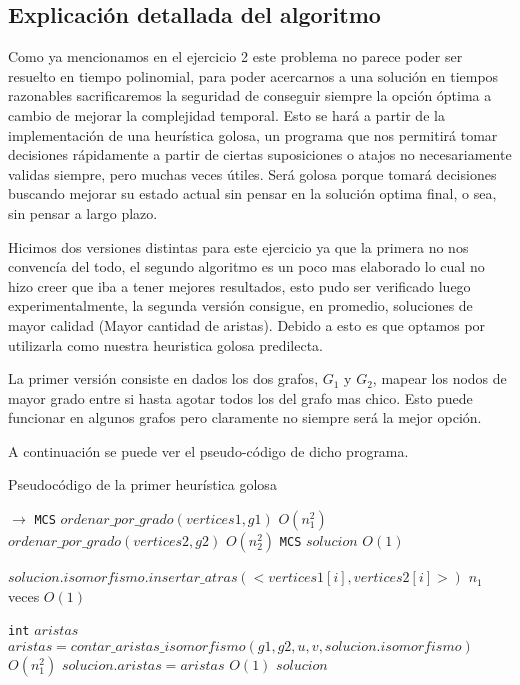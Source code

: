 \subsection{Explicación detallada del algoritmo}

Como ya mencionamos en el ejercicio 2 este problema no parece poder ser resuelto en tiempo polinomial, para poder acercarnos a una solución en tiempos razonables sacrificaremos la seguridad de conseguir siempre la opción óptima a cambio de mejorar la complejidad temporal. Esto se hará a partir de la implementación de una heurística golosa, un programa que nos permitirá tomar decisiones rápidamente a partir de ciertas suposiciones o atajos no necesariamente validas siempre, pero muchas veces
útiles. Será golosa porque tomará decisiones buscando mejorar su estado actual sin pensar en la solución optima final, o sea, sin pensar a largo plazo.

Hicimos dos versiones distintas para este ejercicio ya que la primera no nos convencía del todo, el segundo algoritmo es un poco mas elaborado lo cual no hizo creer que iba a tener mejores resultados, esto pudo ser verificado luego experimentalmente, la segunda versión consigue, en promedio, soluciones de mayor calidad (Mayor cantidad de aristas). Debido a esto es que optamos por utilizarla como nuestra heuristica golosa predilecta.

La primer versión consiste en dados los dos grafos, $G_1$ y $G_2$, mapear los nodos de mayor grado entre si hasta agotar todos los del grafo mas chico. Esto puede funcionar en algunos grafos pero claramente no siempre será la mejor opción. 

A continuación se puede ver el pseudo-código de dicho programa.

\begin{algorithm}[H]
  \begin{algorithmic}[1]
  \caption{Pseudocódigo de la primer heurística golosa}
  \label{algo:4-1}
     $\to$ \texttt{MCS}
      \State $ordenar\_por\_grado(vertices1, g1)$ 
        \Comment $O(n_1^2)$ 
      \State $ordenar\_por\_grado(vertices2, g2)$ 
        \Comment $O(n_2^2)$ 
      \State \texttt{MCS} $solucion$ 
        \Comment $O(1)$ 

	  \State  $solucion.isomorfismo.insertar\_atras(<vertices1[i],vertices2[i]>)$
      \Comment $n_1$ veces $O(1)$
    	  \EndFor

	  \State \texttt{int} $aristas$
	  \State $ aristas = contar\_aristas\_isomorfismo(g1,g2,u,v, solucion.isomorfismo)$
      \Comment $O(n_1^2)$
	  \State $solucion.aristas = aristas$
	  \Comment $O(1)$
      \State \Return $solucion$
      \EndProcedure
	\end{algorithmic}
\end{algorithm}

